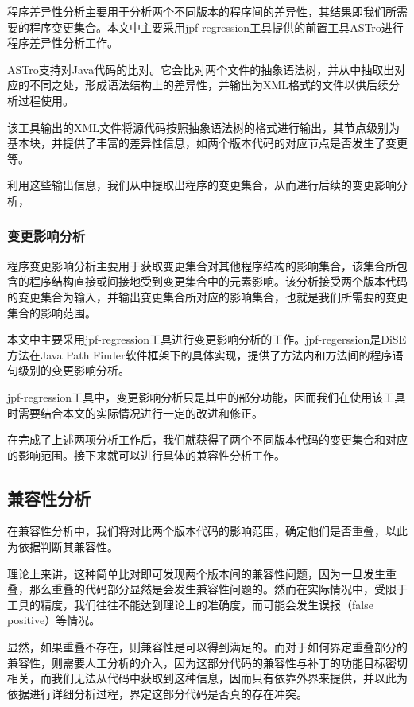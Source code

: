 程序差异性分析主要用于分析两个不同版本的程序间的差异性，其结果即我们所需要的程序变更集合。本文中主要采用jpf-regression工具提供的前置工具ASTro进行程序差异性分析工作。

ASTro支持对Java代码的比对。它会比对两个文件的抽象语法树，并从中抽取出对应的不同之处，形成语法结构上的差异性，并输出为XML格式的文件以供后续分析过程使用。

该工具输出的XML文件将源代码按照抽象语法树的格式进行输出，其节点级别为基本块，并提供了丰富的差异性信息，如两个版本代码的对应节点是否发生了变更等。

利用这些输出信息，我们从中提取出程序的变更集合，从而进行后续的变更影响分析，

\subsubsection{变更影响分析}

程序变更影响分析主要用于获取变更集合对其他程序结构的影响集合，该集合所包含的程序结构直接或间接地受到变更集合中的元素影响。该分析接受两个版本代码的变更集合为输入，并输出变更集合所对应的影响集合，也就是我们所需要的变更集合的影响范围。

本文中主要采用jpf-regression工具进行变更影响分析的工作。jpf-regerssion是DiSE方法在Java Path Finder软件框架下的具体实现，提供了方法内和方法间的程序语句级别的变更影响分析。

jpf-regression工具中，变更影响分析只是其中的部分功能，因而我们在使用该工具时需要结合本文的实际情况进行一定的改进和修正。

在完成了上述两项分析工作后，我们就获得了两个不同版本代码的变更集合和对应的影响范围。接下来就可以进行具体的兼容性分析工作。

\subsection{兼容性分析}

在兼容性分析中，我们将对比两个版本代码的影响范围，确定他们是否重叠，以此为依据判断其兼容性。

理论上来讲，这种简单比对即可发现两个版本间的兼容性问题，因为一旦发生重叠，那么重叠的代码部分显然是会发生兼容性问题的。然而在实际情况中，受限于工具的精度，我们往往不能达到理论上的准确度，而可能会发生误报（false positive）等情况。

显然，如果重叠不存在，则兼容性是可以得到满足的。而对于如何界定重叠部分的兼容性，则需要人工分析的介入，因为这部分代码的兼容性与补丁的功能目标密切相关，而我们无法从代码中获取到这种信息，因而只有依靠外界来提供，并以此为依据进行详细分析过程，界定这部分代码是否真的存在冲突。

